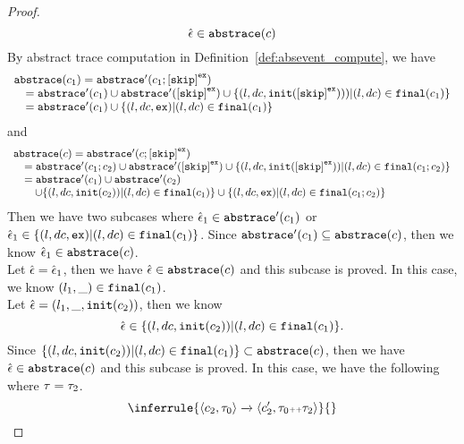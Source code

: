 \begin{proof}
\[      \hat{\mathtt{\epsilon}{}} \in \mathtt{abs}{\mathtt{trace}}(c)
    \]
    By abstract trace computation in Definition~\ref{def:absevent_compute}, we have
    \[
      \begin{array}{l}
        \absflow(c_1) = \absflow'(c_1; \clabel{\eskip}^{\lex}) 
        \\ \quad
        = \absflow'(c_1) \cup \absflow'(\clabel{\eskip}^{\lex}) 
        \cup \{ (l, dc, \absinit(\clabel{\eskip}^{\lex}))) | (l, dc) \in \absfinal(c_1) \} 
        \\ \quad
        = \absflow'(c_1) \cup  \{ (l, dc, \lex) | (l, dc) \in \absfinal(c_1) \} 
     \end{array}
    \]  
    and 
    \[
      \begin{array}{l}
        \absflow(c) = \absflow'(c; \clabel{\eskip}^{\lex}) 
        \\ \quad
        = \absflow'(c_1;c_2) \cup \absflow'(\clabel{\eskip}^{\lex}) 
        \cup \{ (l, dc, \absinit(\clabel{\eskip}^{\lex})) | (l, dc) \in \absfinal(c_1; c_2) \} 
        \\ \quad  
        = \absflow'(c_1) \cup \absflow'(c_2) 
        \\ \quad \quad
        \cup \{ (l, dc, \absinit(c_2)) | (l, dc) \in \absfinal(c_1) \} 
        \cup \{ (l, dc, \lex) | (l, dc) \in \absfinal(c_1; c_2) \} 
     \end{array}
    \]
    Then we have two subcases where 
    $\hat{\mathtt{\epsilon}{}}_1 \in \mathtt{abs}{\mathtt{trace}}'(c_1)$ or $\hat{\mathtt{\epsilon}{}}_1 \in \{ (l, dc, \mathtt{ex}) | (l, dc) \in \mathtt{final}(c_1) \}$.
    Since $\mathtt{abs}{\mathtt{trace}}'(c_1) \subseteq \mathtt{abs}{\mathtt{trace}}(c)$, then we know $\hat{\mathtt{\epsilon}{}}_1 \in \mathtt{abs}{\mathtt{trace}}(c)$.
    \\
    Let $\hat{\mathtt{\epsilon}{}} = \hat{\mathtt{\epsilon}{}}_1$, then we have $\hat{\mathtt{\epsilon}{}} \in \mathtt{abs}{\mathtt{trace}}(c)$ and this subcase is proved.
    In this case, we know $(l_1, \_) \in \mathtt{final}(c_1)$.
    \\
    Let $\hat{\mathtt{\epsilon}{}} = (l_1, \_, \mathtt{init}(c_2))$, then we know 
    \[
      \hat{\mathtt{\epsilon}{}} \in   \{ (l, dc, \mathtt{init}(c_2)) | (l, dc) \in \mathtt{final}(c_1) \}. 
    \]
    Since $\{ (l, dc, \mathtt{init}(c_2)) | (l, dc) \in \mathtt{final}(c_1) \}  \subset\mathtt{abs}{\mathtt{trace}}(c)$,  then we have $\hat{\mathtt{\epsilon}{}} \in \mathtt{abs}{\mathtt{trace}}(c)$ and this subcase is proved.
    In this case, we have the following where $\mathtt{\tau} = \mathtt{\tau}_2$.
    \[
      \inferrule
      {
      \config{{c_2, \trace_0}}
      \xrightarrow{}
      \config{{c_2',  \trace_0 \tracecat \trace_2}}
      }
      {
}\]
\end{proof}
